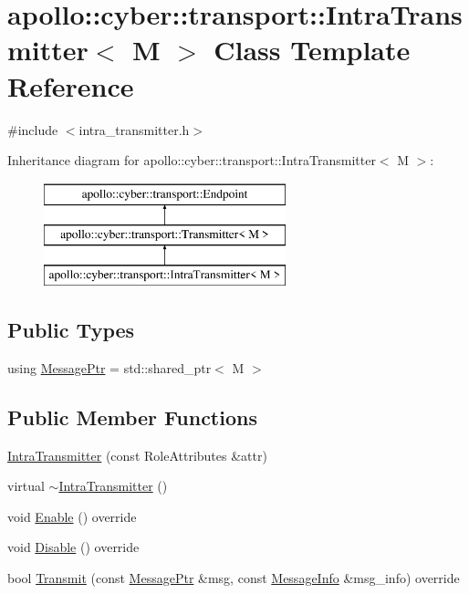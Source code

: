 \hypertarget{classapollo_1_1cyber_1_1transport_1_1IntraTransmitter}{\section{apollo\-:\-:cyber\-:\-:transport\-:\-:Intra\-Transmitter$<$ M $>$ Class Template Reference}
\label{classapollo_1_1cyber_1_1transport_1_1IntraTransmitter}
}


{\ttfamily \#include $<$intra\-\_\-transmitter.\-h$>$}

Inheritance diagram for apollo\-:\-:cyber\-:\-:transport\-:\-:Intra\-Transmitter$<$ M $>$\-:\begin{figure}[H]
\begin{center}
\leavevmode
\includegraphics[height=3.000000cm]{classapollo_1_1cyber_1_1transport_1_1IntraTransmitter}
\end{center}
\end{figure}
\subsection*{Public Types}
\begin{DoxyCompactItemize}
\item 
using \hyperlink{classapollo_1_1cyber_1_1transport_1_1IntraTransmitter_ae47240b6bbe5421bb9d2e4b87d2ff98e}{Message\-Ptr} = std\-::shared\-\_\-ptr$<$ M $>$
\end{DoxyCompactItemize}
\subsection*{Public Member Functions}
\begin{DoxyCompactItemize}
\item 
\hyperlink{classapollo_1_1cyber_1_1transport_1_1IntraTransmitter_a1aecd865eff74d333f636675eb2c9383}{Intra\-Transmitter} (const Role\-Attributes \&attr)
\item 
virtual \hyperlink{classapollo_1_1cyber_1_1transport_1_1IntraTransmitter_ae672e4cfafd5f968acb439f36b0c4a10}{$\sim$\-Intra\-Transmitter} ()
\item 
void \hyperlink{classapollo_1_1cyber_1_1transport_1_1IntraTransmitter_ae8fec0fd79775a79e8998ec87b83e9b8}{Enable} () override
\item 
void \hyperlink{classapollo_1_1cyber_1_1transport_1_1IntraTransmitter_ad6bb7e42eb0486f755a64a555f3e9727}{Disable} () override
\item 
bool \hyperlink{classapollo_1_1cyber_1_1transport_1_1IntraTransmitter_a230dcd2a4cd7582326a1a21050b9b298}{Transmit} (const \hyperlink{classapollo_1_1cyber_1_1transport_1_1IntraTransmitter_ae47240b6bbe5421bb9d2e4b87d2ff98e}{Message\-Ptr} \&msg, const \hyperlink{classapollo_1_1cyber_1_1transport_1_1MessageInfo}{Message\-Info} \&msg\-\_\-info) override
\end{DoxyCompactItemize}
